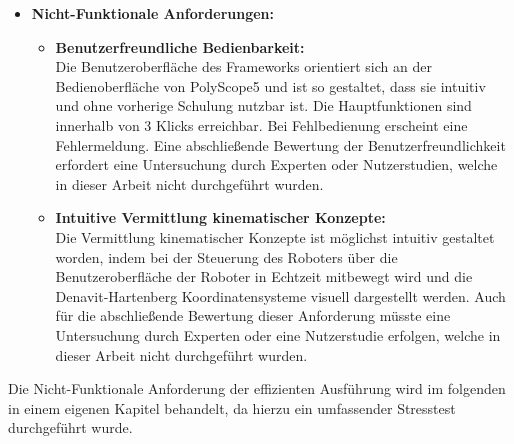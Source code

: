 \begin{itemize}
\begin{itemize}
        \item \textbf{Bewegung im lokalen und globalen Koordinatensystem:} \\
        Die Bewegung des Endeffektors kann sowohl im lokalen als auch im globalen Koordinatensystem erfolgen, wodurch diese Anforderung erfüllt wird.

        \item \textbf{Manuelle Konfiguration der Gelenkwinkel:} \\
        Mittels interaktiver Schieberegler können die Gelenkwinkel des Roboters manuell angepasst werden. Änderungen werden sofort in der Visualisierung übernommen, sodass die Anforderung erfüllt ist.
    \end{itemize}




    \item \textbf{Nicht-Funktionale Anforderungen:}
    \begin{itemize}
        \item \textbf{Benutzerfreundliche Bedienbarkeit:} \\
        Die Benutzeroberfläche des Frameworks orientiert sich an der Bedienoberfläche von PolyScope5 und ist so gestaltet, dass sie intuitiv und ohne vorherige Schulung nutzbar ist.
        Die Hauptfunktionen sind innerhalb von 3 Klicks erreichbar.
        Bei Fehlbedienung erscheint eine Fehlermeldung.
        Eine abschließende Bewertung der Benutzerfreundlichkeit erfordert eine Untersuchung durch Experten oder Nutzerstudien, welche in dieser Arbeit nicht durchgeführt wurden.

        \item \textbf{Intuitive Vermittlung kinematischer Konzepte:} \\
        Die Vermittlung kinematischer Konzepte ist möglichst intuitiv gestaltet worden, indem bei der Steuerung des Roboters über die Benutzeroberfläche der Roboter in Echtzeit mitbewegt wird
        und die Denavit-Hartenberg Koordinatensysteme visuell dargestellt werden. Auch für die abschließende Bewertung dieser Anforderung müsste eine Untersuchung durch Experten oder eine Nutzerstudie erfolgen,
        welche in dieser Arbeit nicht durchgeführt wurden.
    \end{itemize}

\end{itemize}


Die Nicht-Funktionale Anforderung der effizienten Ausführung wird im folgenden in einem eigenen Kapitel behandelt, da hierzu ein umfassender Stresstest durchgeführt wurde.


